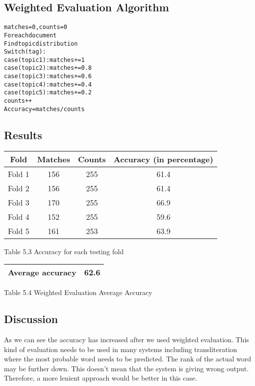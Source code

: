 \subsection*{Weighted Evaluation Algorithm}

\begin{alltt}
matches=0, counts=0
For each document
  Find topic distribution
  Switch(tag):
    case(topic1): matches += 1
    case(topic2): matches += 0.8
    case(topic3): matches += 0.6
    case(topic4): matches += 0.4
    case(topic5): matches += 0.2
    counts++
Accuracy = matches/counts
\end{alltt}

\subsection*{Results}

\begin{center}
\begin{tabular}{ |c|c|c|c| }
  \hline
  Fold & Matches & Counts & Accuracy (in percentage) \\ \hline
  Fold 1 & 156 & 255 & 61.4 \\ \hline
  Fold 2 & 156 & 255 & 61.4 \\ \hline
  Fold 3 & 170 & 255 & 66.9 \\ \hline
  Fold 4 & 152 & 255 & 59.6 \\ \hline
  Fold 5 & 161 & 253 & 63.9 \\ \hline
\end{tabular}
\end{center}
\begin{center}
 Table 5.3 Accuracy for each testing fold 
\end{center}

\begin{center}
\begin{tabular}{ |c|c| }
  \hline
  Average accuracy & 62.6 \\ \hline
\end{tabular}
\end{center}
\begin{center}
 Table 5.4 Weighted Evaluation Average Accuracy 
\end{center}

\subsection*{Discussion}

\par
As we can see the accuracy has increased after we used weighted evaluation. This kind of evaluation needs to be used in many systems including
transliteration where the most probable word needs to be predicted. The rank of the actual word may be further down. This doesn't mean that the
system is giving wrong output. Therefore, a more lenient approach would be better in this case. 

